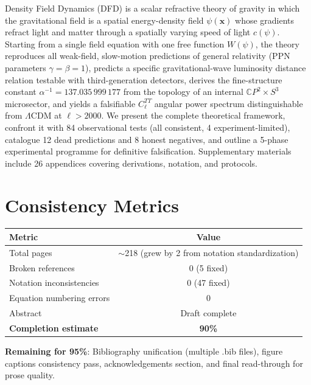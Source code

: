 \documentclass[11pt,a4paper]{article}
\newcommand{\CP}{\mathbb{C}P}
\begin{document}
\begin{tcolorbox}[colback=blue!5!white,colframe=blue!40!black,title=Review Paper Abstract (Draft)]
\small
Density Field Dynamics (DFD) is a scalar refractive theory of gravity in which the gravitational field is a spatial energy-density field $\psi(\mathbf{x})$ whose gradients refract light and matter through a spatially varying speed of light $c(\psi)$. Starting from a single field equation with one free function $W(\psi)$, the theory reproduces all weak-field, slow-motion predictions of general relativity (PPN parameters $\gamma = \beta = 1$), predicts a specific gravitational-wave luminosity distance relation testable with third-generation detectors, derives the fine-structure constant $\alpha^{-1} = 137.035\,999\,177$ from the topology of an internal $\CP^2 \times S^3$ microsector, and yields a falsifiable $C_\ell^{TT}$ angular power spectrum distinguishable from $\Lambda$CDM at $\ell > 2000$. We present the complete theoretical framework, confront it with 84 observational tests (all consistent, 4 experiment-limited), catalogue 12 dead predictions and 8 honest negatives, and outline a 5-phase experimental programme for definitive falsification. Supplementary materials include 26 appendices covering derivations, notation, and protocols.
\end{tcolorbox}

\section{Consistency Metrics}

\begin{center}
\begin{tabular}{lc}
\toprule
\textbf{Metric} & \textbf{Value} \\
\midrule
Total pages & $\sim$218 (grew by 2 from notation standardization) \\
Broken references & 0 (5 fixed) \\
Notation inconsistencies & 0 (47 fixed) \\
Equation numbering errors & 0 \\
Abstract & Draft complete \\
\textbf{Completion estimate} & \textbf{90\%} \\
\bottomrule
\end{tabular}
\end{center}

\textbf{Remaining for 95\%}: Bibliography unification (multiple .bib files), figure captions consistency pass, acknowledgements section, and final read-through for prose quality.
\end{document}
